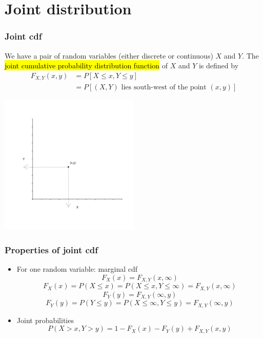 \documentclass[slidestop,compress,mathserif]{beamer}
\begin{document}
\section{Joint distribution}
\begin{frame}
\frametitle{Joint cdf}

\begin{defn}
We have a pair of random variables (either discrete or continuous) $X$ and $Y$.
The \hl{joint cumulative probability distribution function} of $X$ and $Y$ is defined by
\vspace{-0.3cm}
\begin{align*}
F_{X, Y}(x,y) &= P[ X \leq x, Y \leq y ] \\
 &= P[ (X,Y)\text{ lies south-west of the point }(x,y) ]
\end{align*}
\end{defn}

\vspace{-0.7cm}
\begin{center}
\includegraphics[width=0.5\textwidth]{figures/cdf.pdf}
\end{center}


\end{frame}


\begin{frame}
\frametitle{Properties of joint cdf}

\begin{itemize}
\item For one random variable: marginal cdf
\[ F_X(x) =   F_{X, Y}(x, \infty)\]
\[ F_X(x) = P(X \leq x) = P(X \leq x, Y \leq \infty) =  F_{X, Y}(x, \infty)\]
\[ F_Y(y) =   F_{X, Y}(\infty, y)\]
\[ F_Y(y) = P(Y \leq y) = P(X \leq \infty, Y \leq y) =  F_{X, Y}(\infty, y)\]


\item Joint probabilities
\[ P(X > x, Y > y) = 1 - F_X(x) - F_Y(y) + F_{X, Y}(x, y)\]
\end{itemize}


\end{frame}
\end{document}
